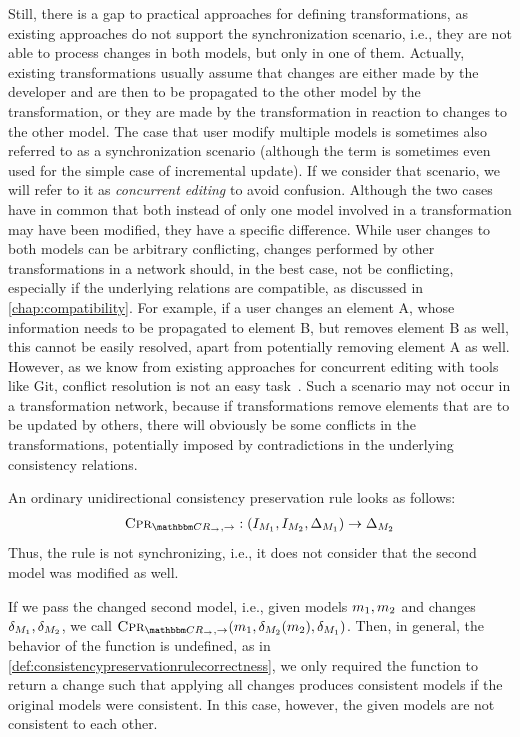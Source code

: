 Still, there is a gap to practical approaches for defining transformations, as existing approaches do not support the synchronization scenario, i.e., they are not able to process changes in both models, but only in one of them.
Actually, existing transformations usually assume that changes are either made by the developer and are then to be propagated to the other model by the transformation, or they are made by the transformation in reaction to changes to the other model.
The case that user modify multiple models is sometimes also referred to as a synchronization scenario (although the term is sometimes even used for the simple case of incremental update).
If we consider that scenario, we will refer to it as \emph{concurrent editing} to avoid confusion.
Although the two cases have in common that both instead of only one model involved in a transformation may have been modified, they have a specific difference.
While user changes to both models can be arbitrary conflicting, changes performed by other transformations in a network should, in the best case, not be conflicting, especially if the underlying relations are compatible, as discussed in \autoref{chap:compatibility}.
For example, if a user changes an element A, whose information needs to be propagated to element B, but removes element B as well, this cannot be easily resolved, apart from potentially removing element A as well.
However, as we know from existing approaches for concurrent editing with tools like Git, conflict resolution is not an easy task~.
Such a scenario may not occur in a transformation network, because if transformations remove elements that are to be updated by others, there will obviously be some conflicts in the transformations, potentially imposed by contradictions in the underlying consistency relations.

An ordinary unidirectional consistency preservation rule looks as follows:
\begin{align*}
    \consistencypreservationrule{\consistencyrelationset{CR}_{\rightarrow},\rightarrow} : (\metamodelinstanceset{M}{1}, \metamodelinstanceset{M}{2}, \changeuniverse{\metamodel{M}{1}}) \rightarrow \changeuniverse{\metamodel{M}{2}}
\end{align*}
Thus, the rule is not synchronizing, i.e., it does not consider that the second model was modified as well.

If we pass the changed second model, i.e., given models $m_{1},m_{2}$ and changes $\delta_{M_{1}},\delta_{M_{2}}$, we call $\consistencypreservationrule{\consistencyrelationset{CR}_{\rightarrow},\rightarrow}(\model{m}{1},\change{\metamodel{M}{2}}(\model{m}{2}),\change{\metamodel{M}{1}})$.
Then, in general, the behavior of the function is undefined, as in \autoref{def:consistencypreservationrulecorrectness}, we only required the function to return a change such that applying all changes produces consistent models if the original models were consistent.
In this case, however, the given models are not consistent to each other.


